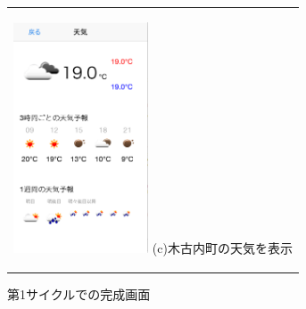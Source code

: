 \begin{figure}[htbp]
\begin{center}
\begin{tabular}{c}
      \begin{minipage}{0.33\hsize}
        \begin{center}
\includegraphics[width=4cm, bb=0 0 320 549]{5.3_weather.png}
          \hspace{1cm} (c)木古内町の天気を表示
        \end{center}
      \end{minipage}

    \end{tabular}
    \caption{第1サイクルでの完成画面 }
    
    \label{fig:lena}
  \end{center}
\end{figure}
